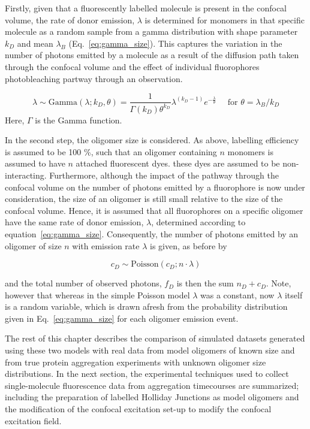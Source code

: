 Firstly, given that a fluorescently labelled molecule is present in the confocal volume, the rate of donor emission, $\lambda$ is determined for monomers in that specific molecule as a random sample from a gamma distribution with shape parameter $k_D$ and mean $\lambda_B$ (Eq.~\ref{eq:gamma_size}). This captures the variation in the number of photons emitted by a molecule as a result of the diffusion path taken through the confocal volume and the effect of individual fluorophores photobleaching partway through an observation.

\begin{equation}
\lambda \sim \text{Gamma}(\lambda; k_D, \theta) =  \frac{1}{\Gamma(k_D) \theta^{k_D}} \lambda^{(k_D - 1)} e^{-\frac{\lambda}{\theta}} \quad\text{ for } \theta = \lambda_B / k_D
\label{eq:gamma_size}
\end{equation} 
Here, $\Gamma$ is the Gamma function. 

In the second step, the oligomer size is considered. As above, labelling efficiency is assumed to be 100 \%, such that an oligomer containing $n$ monomers is assumed to have $n$ attached fluorescent dyes. these dyes are assumed to be non-interacting. Furthermore, although the impact of the pathway through the confocal volume on the number of photons emitted by a fluorophore is now under consideration, the size of an oligomer is still small relative to the size of the confocal volume. Hence, it is assumed that all fluorophores on a specific oligomer have the same rate of donor emission, $\lambda$, determined according to equation~\ref{eq:gamma_size}. Consequently, the number of photons emitted by an oligomer of size $n$ with emission rate $\lambda$ is given, as before by

\begin{equation}
c_D \sim \text{Poisson}(c_D; n \cdot \lambda)
\end{equation}  

and the total number of observed photons, $f_D$ is then the sum $n_D + c_D$. Note, however that whereas in the simple Poisson model $\lambda$ was a constant, now $\lambda$ itself is a random variable, which is drawn afresh from the probability distribution given in Eq.~\ref{eq:gamma_size} for each oligomer emission event.

The rest of this chapter describes the comparison of simulated datasets generated using these two models with real data from model oligomers of known size and from true protein aggregation experiments with unknown oligomer size distributions. In the next section, the experimental techniques used to collect single-molecule fluorescence data from aggregation timecourses are summarized; including the preparation of labelled Holliday Junctions as model oligomers and the modification of the confocal excitation set-up to modify the confocal excitation field. 

